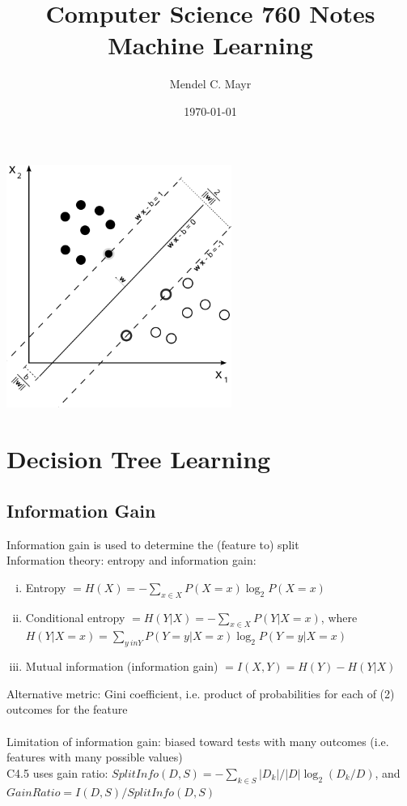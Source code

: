 \documentclass{article}
\title{Computer Science 760 Notes \\ Machine Learning}
\author{Mendel C. Mayr}
\date{\today}
\begin{document}
	\maketitle
	\vspace{10pt}
	\begin{center}
		\includegraphics[width = 2.9in]{svm.png}
		\end{center}
	\vspace{16pt}
	\tableofcontents
	\clearpage

	\section{Decision Tree Learning}
		\subsection{Information Gain}
			Information gain is used to determine the (feature to) split \\
			Information theory: entropy and information gain:
			\begin{enumerate}[(i)]
				\item Entropy $= H(X) = -\sum_{x \in X}P(X = x)\log_2 P(X = x)$
				\item Conditional entropy $= H(Y|X) = -\sum_{x \in X}P(Y|X = x)$, where \\
				$H(Y|X = x) = \sum_{y \ in Y}P(Y = y|X = x)\log_2 P(Y = y|X = x)$
				\item Mutual information (information gain) $= I(X, Y) = H(Y) - H(Y|X)$
				\end{enumerate}
			Alternative metric: Gini coefficient, i.e. product of probabilities for each of (2) outcomes for the feature \\
			\\
			Limitation of information gain: biased toward tests with many outcomes (i.e. features with many possible values) \\
			C4.5 uses gain ratio: $SplitInfo(D, S) = -\sum_{k \in S} |D_k|/|D| \log_2(D_k/D)$, and $GainRatio = I(D, S)/SplitInfo(D, S)$
\end{document}
